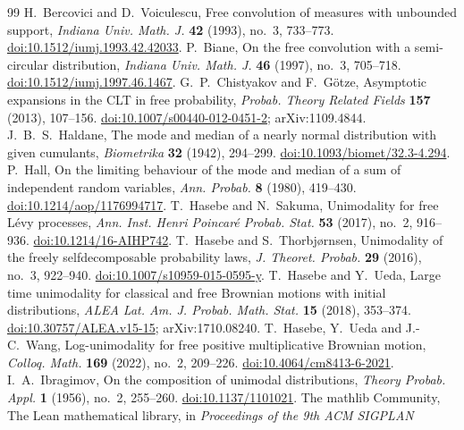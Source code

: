 \documentclass[11pt]{amsart}
\theoremstyle{definition}
\begin{document}
\begin{thebibliography}{99}
 H.~Bercovici and D.~Voiculescu, Free convolution of measures with unbounded support, \emph{Indiana Univ.
Math. J.} \textbf{42} (1993), no.~3, 733--773.
\href{https://doi.org/10.1512/iumj.1993.42.42033}{doi:10.1512/iumj.1993.42.42033}.
 P.~Biane, On the free convolution with a semi-circular distribution, \emph{Indiana Univ. Math. J.}
\textbf{46} (1997), no.~3, 705--718.
\href{https://doi.org/10.1512/iumj.1997.46.1467}{doi:10.1512/iumj.1997.46.1467}.
 G.~P.~Chistyakov and F.~G\"otze, Asymptotic expansions in the CLT in free probability, \emph{Probab.
Theory Related Fields} \textbf{157} (2013), 107--156.
\href{https://doi.org/10.1007/s00440-012-0451-2}{doi:10.1007/s00440-012-0451-2}; arXiv:1109.4844.
 J.~B.~S.~Haldane, The mode and median of a nearly normal distribution with given cumulants,
\emph{Biometrika} \textbf{32} (1942), 294--299.
\href{https://doi.org/10.1093/biomet/32.3-4.294}{doi:10.1093/biomet/32.3-4.294}.
 P.~Hall, On the limiting behaviour of the mode and median of a sum of independent random variables,
\emph{Ann. Probab.} \textbf{8} (1980), 419--430.
\href{https://doi.org/10.1214/aop/1176994717}{doi:10.1214/aop/1176994717}.
 T.~Hasebe and N.~Sakuma, Unimodality for free L\'evy processes, \emph{Ann. Inst. Henri Poincar\'e
Probab. Stat.} \textbf{53} (2017), no.~2, 916--936.
\href{https://doi.org/10.1214/16-AIHP742}{doi:10.1214/16-AIHP742}.
 T.~Hasebe and S.~Thorbj\o rnsen, Unimodality of the freely selfdecomposable probability laws, \emph{J.
Theoret. Probab.} \textbf{29} (2016), no.~3, 922--940.
\href{https://doi.org/10.1007/s10959-015-0595-y}{doi:10.1007/s10959-015-0595-y}.
 T.~Hasebe and Y.~Ueda, Large time unimodality for classical and free Brownian motions with initial
distributions, \emph{ALEA Lat. Am. J. Probab. Math. Stat.} \textbf{15} (2018), 353--374.
\href{https://doi.org/10.30757/ALEA.v15-15}{doi:10.30757/ALEA.v15-15}; arXiv:1710.08240.
 T.~Hasebe, Y.~Ueda and J.-C.~Wang, Log-unimodality for free positive multiplicative Brownian motion,
\emph{Colloq. Math.} \textbf{169} (2022), no.~2, 209--226.
\href{https://doi.org/10.4064/cm8413-6-2021}{doi:10.4064/cm8413-6-2021}.
 I.~A.~Ibragimov, On the composition of unimodal distributions, \emph{Theory Probab. Appl.} \textbf{1}
(1956), no.~2, 255--260. \href{https://doi.org/10.1137/1101021}{doi:10.1137/1101021}.
 The mathlib Community, The Lean mathematical library, in \emph{Proceedings of the 9th ACM SIGPLAN
}
\end{thebibliography}
\end{document}
